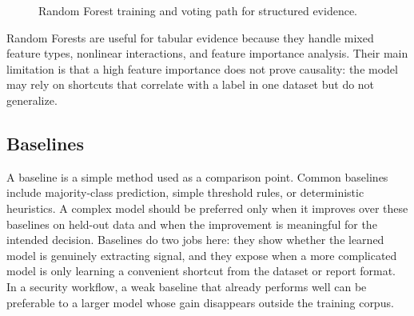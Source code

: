\begin{figure}[H]
\centering
{}
\caption{Random Forest training and voting path for structured evidence.}
\label{fig:pfe-ai-random-forest}
\end{figure}

Random Forests are useful for tabular evidence because they handle mixed
feature types, nonlinear interactions, and feature importance analysis. Their
main limitation is that a high feature importance does not prove causality:
the model may rely on shortcuts that correlate with a label in one dataset but
do not generalize.

\subsection{Baselines}

A baseline is a simple method used as a comparison point. Common baselines
include majority-class prediction, simple threshold rules, or deterministic
heuristics. A complex model should be preferred only when it improves over
these baselines on held-out data and when the improvement is meaningful for
the intended decision. Baselines do two jobs here: they show whether the
learned model is genuinely extracting signal, and they expose when a more
complicated model is only learning a convenient shortcut from the dataset or
report format. In a security workflow, a weak baseline that already performs
well can be preferable to a larger model whose gain disappears outside the
training corpus.


